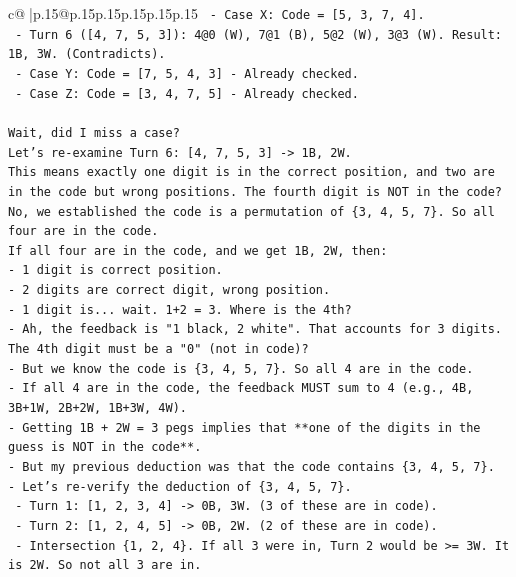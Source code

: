 \documentclass{article}
\begin{document}
{\begin{supertabular}{c@{$\;$}|p{.15\linewidth}@{}p{.15\linewidth}p{.15\linewidth}p{.15\linewidth}p{.15\linewidth}p{.15\linewidth}}
{{{\texttt{      {-} Case X: Code = {[}5, 3, 7, 4{]}.} \\
\texttt{        {-} Turn 6 ({[}4, 7, 5, 3{]}): 4@0 (W), 7@1 (B), 5@2 (W), 3@3 (W). Result: 1B, 3W. (Contradicts).} \\
\texttt{      {-} Case Y: Code = {[}7, 5, 4, 3{]} {-} Already checked.} \\
\texttt{      {-} Case Z: Code = {[}3, 4, 7, 5{]} {-} Already checked.} \\
\\ 
\texttt{Wait, did I miss a case?} \\
\texttt{Let's re{-}examine Turn 6: {[}4, 7, 5, 3{]} {-}> 1B, 2W.} \\
\texttt{This means exactly one digit is in the correct position, and two are in the code but wrong positions. The fourth digit is NOT in the code?} \\
\texttt{No, we established the code is a permutation of \{3, 4, 5, 7\}. So all four are in the code.} \\
\texttt{If all four are in the code, and we get 1B, 2W, then:} \\
\texttt{{-} 1 digit is correct position.} \\
\texttt{{-} 2 digits are correct digit, wrong position.} \\
\texttt{{-} 1 digit is... wait. 1+2 = 3. Where is the 4th?} \\
\texttt{{-} Ah, the feedback is "1 black, 2 white". That accounts for 3 digits. The 4th digit must be a "0" (not in code)?} \\
\texttt{{-} But we know the code is \{3, 4, 5, 7\}. So all 4 are in the code.} \\
\texttt{{-} If all 4 are in the code, the feedback MUST sum to 4 (e.g., 4B, 3B+1W, 2B+2W, 1B+3W, 4W).} \\
\texttt{{-} Getting 1B + 2W = 3 pegs implies that **one of the digits in the guess is NOT in the code**.} \\
\texttt{{-} But my previous deduction was that the code contains \{3, 4, 5, 7\}.} \\
\texttt{{-} Let's re{-}verify the deduction of \{3, 4, 5, 7\}.} \\
\texttt{  {-} Turn 1: {[}1, 2, 3, 4{]} {-}> 0B, 3W. (3 of these are in code).} \\
\texttt{  {-} Turn 2: {[}1, 2, 4, 5{]} {-}> 0B, 2W. (2 of these are in code).} \\
\texttt{    {-} Intersection \{1, 2, 4\}. If all 3 were in, Turn 2 would be >= 3W. It is 2W. So not all 3 are in.} \\
}}}
\end{supertabular}}
\end{document}
